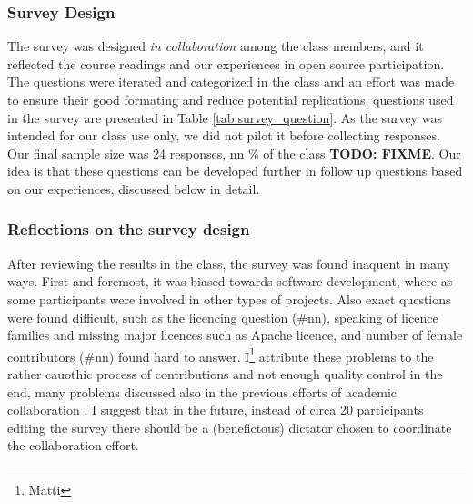 \subsubsection{Survey Design}

The survey was designed {\it in collaboration} among the class members, and it reflected the course readings and our experiences in open source participation. The questions were iterated and categorized in the class and an effort was made to ensure their good formating and reduce potential replications; questions used in the survey are presented in Table \ref{tab:survey_question}. As the survey was intended for our class use only, we did not pilot it before collecting responses. Our final sample size was 24 responses, nn \% of the class \textbf{TODO: FIXME}. Our idea is that these questions can be developed further in follow up questions based on our experiences, discussed below in detail.

\subsubsection{Reflections on the survey design}

After reviewing the results in the class, the survey was found inaquent in many ways. First and foremost, it was biased towards software development, where as some participants were involved in other types of projects. Also exact questions were found difficult, such as the licencing question (\#nn), speaking of licence families and missing major licences such as Apache licence, and number of female contributors (\#nn) found hard to answer. I\footnote{Matti} attribute these problems to the rather cauothic process of contributions and not enough quality control in the end, many problems discussed also in the previous efforts of academic collaboration \cite{Tomlinson2012}. I suggest that in the future, instead of circa 20 participants editing the survey there should be a (benefictous) dictator chosen to coordinate the collaboration effort.


